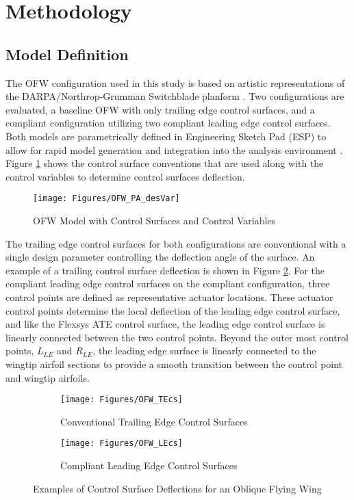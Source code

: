 \section{Methodology}

\subsection{Model Definition}
The OFW configuration used in this study is based on artistic representations of the DARPA/Northrop-Grumman Switchblade planform \cite{deslich2020}.
Two configurations are evaluated, a baseline OFW with only trailing edge control surfaces, and a compliant configuration utilizing two compliant leading edge control surfaces.
Both models are parametrically defined in Engineering Sketch Pad (ESP) to allow for rapid model generation and integration into the analysis environment \cite{EngSktPad}.
Figure \ref{fig:method:OFW_cs} shows the control surface conventions that are used along with the control variables to determine control surfaces deflection.

\begin{figure}[h]
  \centering
  \texttt{[image: Figures/OFW\_PA\_desVar]}
  \caption{OFW Model with Control Surfaces and Control Variables}
  \label{fig:method:OFW_cs}
\end{figure}
\FloatBarrier

The trailing edge control surfaces for both configurations are conventional with a single design parameter controlling the deflection angle of the surface.
An example of a trailing control surface deflection is shown in Figure \ref{fig:method:OFW_TEcs}.
For the compliant leading edge control surfaces on the compliant configuration, three control points are defined as representative actuator locations.
These actuator control points determine the local deflection of the leading edge control surface, and like the Flexsys ATE control surface, the leading edge control surface is linearly connected between the two control points.
Beyond the outer most control points, $L_{LE}$ and $R_{LE}$, the leading edge surface is linearly connected to the wingtip airfoil sections to provide a smooth transition between the control point and wingtip airfoils.

\begin{figure}[!ht]
  \begin{subfigure}[b]{0.49\textwidth}
    \texttt{[image: Figures/OFW\_TEcs]}
    \caption{Conventional Trailing Edge Control Surfaces}
    \label{fig:method:OFW_TEcs}
  \end{subfigure}
  \hfill
  \begin{subfigure}[b]{0.49\textwidth}
    \texttt{[image: Figures/OFW\_LEcs]}
    \caption{Compliant Leading Edge Control Surfaces}
    \label{fig:method:OFW_LEcs}
  \end{subfigure}
  \caption{Examples of Control Surface Deflections for an Oblique Flying Wing}
\end{figure}

